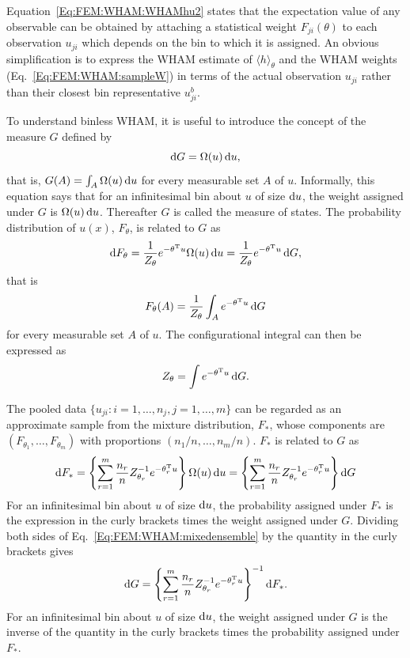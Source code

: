 Equation~\ref{Eq:FEM:WHAM:WHAMhu2} states that the expectation value of any observable can be obtained by attaching a statistical weight $F_{ji}(\theta)$ to each observation $u_{ji}$ which depends on the bin to which it is assigned. An obvious simplification is to express the WHAM estimate of $\langle h\rangle_\theta$ and the WHAM weights (Eq.~\ref{Eq:FEM:WHAM:sampleW}) in terms of the actual observation $u_{ji}$ rather than their closest bin representative $u_{ji}^b$.

To understand binless WHAM, it is useful to introduce the concept of the measure $G$ defined by
\begin{equation}
    \mathop{}\!\mathrm{d} G=\Omega(u)\mathop{}\!\mathrm{d} u,
\end{equation}
that is, $G(A)=\int_A\Omega(u)\mathop{}\!\mathrm{d} u$ for every measurable set $A$ of $u$. Informally, this equation says that for an infinitesimal bin about $u$ of size $\mathop{}\!\mathrm{d} u$, the weight assigned under $G$ is $\Omega(u)\mathop{}\!\mathrm{d} u$. Thereafter $G$ is called the measure of states. The probability distribution of $u(x)$, $F_\theta$, is related to $G$ as
\begin{equation}
    \mathop{}\!\mathrm{d} F_\theta=\frac{1}{Z_\theta}e^{-\theta^\mathrm{T}u}\Omega(u)\mathop{}\!\mathrm{d} u=\frac{1}{Z_\theta}e^{-\theta^\mathrm{T}u}\mathop{}\!\mathrm{d} G,
\end{equation}
that is
\begin{equation}
    F_\theta(A)=\frac{1}{Z_\theta}\int_A e^{-\theta^\mathrm{T}u}\mathop{}\!\mathrm{d} G
\end{equation}
for every measurable set $A$ of $u$. The configurational integral can then be expressed as
\begin{equation}
    Z_\theta=\int e^{-\theta^\mathrm{T}u}\mathop{}\!\mathrm{d} G.
\end{equation}

The pooled data $\{u_{ji}: i=1,\dots,n_j, j=1,\dots,m\}$ can be regarded as an approximate sample from the mixture distribution, $F_\ast$, whose components are $(F_{\theta_1},\dots,F_{\theta_m})$ with proportions $(n_1/n,\dots,n_m/n)$. $F_\ast$ is related to $G$ as 
\begin{equation}
    \mathop{}\!\mathrm{d} F_\ast=\left\{\sum_{r=1}^m\frac{n_r}{n}Z_{\theta_r}^{-1} e^{-\theta_r^{\mathrm{T}}u} \right\}\Omega(u)\mathop{}\!\mathrm{d} u=\left\{\sum_{r=1}^m\frac{n_r}{n}Z_{\theta_r}^{-1} e^{-\theta_r^{\mathrm{T}}u} \right\}\mathop{}\!\mathrm{d} G
    \label{Eq:FEM:WHAM:mixedensemble}
\end{equation}
For an infinitesimal bin about $u$ of size $\mathop{}\!\mathrm{d} u$, the probability assigned under $F_\ast$ is the expression in the curly brackets times the weight assigned under $G$. Dividing both sides of Eq.~\ref{Eq:FEM:WHAM:mixedensemble} by the quantity in the curly brackets  gives
\begin{equation}
    \mathop{}\!\mathrm{d} G=\left\{\sum_{r=1}^m\frac{n_r}{n}Z_{\theta_r}^{-1} e^{-\theta_r^{\mathrm{T}}u} \right\}^{-1}\mathop{}\!\mathrm{d} F_\ast.
    \label{Eq:FEM:WHAM:GofF}
\end{equation}
For an infinitesimal bin about $u$ of size $\mathop{}\!\mathrm{d} u$, the weight assigned under $G$ is the inverse of the quantity in the curly brackets times the probability assigned under $F_\ast$.


